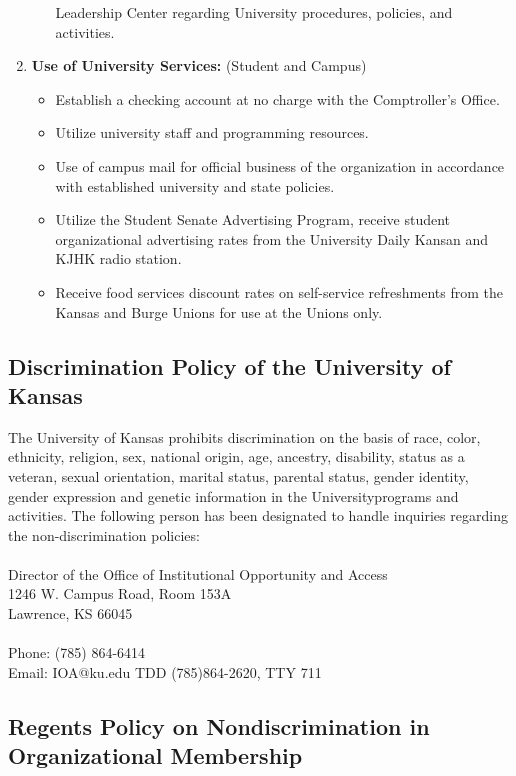 \begin{enumerate}
\begin{itemize}
          Leadership Center regarding University procedures, policies, and
          activities.
  \end{itemize}
  \item \textbf{Use of University Services:} (Student and Campus)
  \begin{itemize}
    \item Establish a checking account at no charge with the Comptroller's
          Office.
    \item Utilize university staff and programming resources.
    \item Use of campus mail for official business of the organization in
          accordance with established university and state policies.
    \item Utilize the Student Senate Advertising Program, receive student
          organizational advertising rates from the University Daily Kansan and
          KJHK radio station.
    \item Receive food services discount rates on self-service refreshments from
          the Kansas and Burge Unions for use at the Unions only.
  \end{itemize}
\end{enumerate}


\subsection{Discrimination Policy of the University of Kansas}

The University of Kansas prohibits discrimination on the basis of race, color,
ethnicity, religion, sex, national origin, age, ancestry, disability, status as
a veteran, sexual orientation, marital status, parental status, gender identity,
gender expression and genetic information in the University\rqs programs and
activities. The following person has been designated to handle inquiries
regarding the non-discrimination policies:
\\
\\
Director of the Office of Institutional Opportunity and Access\\
1246 W. Campus Road, Room 153A\\
Lawrence, KS 66045\\
\\
Phone: (785) 864-6414\\
Email: IOA@ku.edu
TDD (785)864-2620, TTY 711

\subsection{Regents Policy on Nondiscrimination in Organizational Membership}

